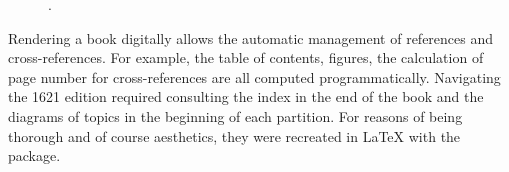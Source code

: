 \begin{figure}[H]
\begin{minipage}{0.27\textwidth}
  \end{minipage}%
  \qquad\begin{minipage}{0.27\textwidth}%
     \begin{minipage}[c][\minipageheight]{\textwidth}%
     \caption*{\scriptsize{}\notefont{}.}
     \end{minipage}
  \end{minipage}%
 \label{fig:schemata-first-edition}%
\end{figure}

Rendering a book digitally allows the automatic management of references and cross-references. For example, the table of contents, figures, the calculation of page number for cross-references \etc{} are all computed programmatically. Navigating the 1621 edition required consulting the index in the end of the book and the diagrams of topics in the beginning of each partition. For reasons of being thorough and of course aesthetics, they were recreated in \LaTeX{} with the \href{https://www.ctan.org/pkg/schemata}{} package.

